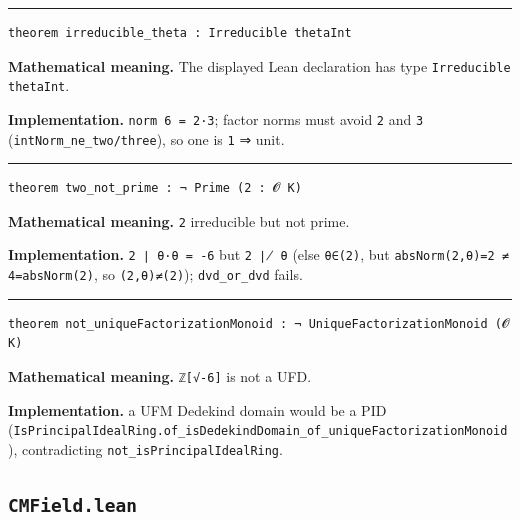 \documentclass[UTF8,a4paper,11pt,fontset=fandol]{ctexart}
\theoremstyle{definition}
\newcommand{\statementsep}{\par\medskip\hrule\medskip}
\begin{document}
\statementsep
\begin{verbatim}
theorem irreducible_theta : Irreducible thetaInt
\end{verbatim}
\noindent\textbf{Mathematical meaning.} The displayed Lean declaration has type \texttt{Irreducible thetaInt}.\par
\noindent\textbf{Implementation.} \texttt{norm 6 = 2·3}; factor norms must avoid \texttt{2} and \texttt{3} (\texttt{intNorm\_\allowbreak{}ne\_\allowbreak{}two/\allowbreak{}three}), so one is \texttt{1} ⇒ unit.\par
\statementsep
\begin{verbatim}
theorem two_not_prime : ¬ Prime (2 : 𝓞 K)
\end{verbatim}
\noindent\textbf{Mathematical meaning.} \texttt{2} irreducible but not prime.\par
\noindent\textbf{Implementation.} \texttt{2 ∣ θ·θ = -6} but \texttt{2 ∤ θ} (else \texttt{θ∈(2)}, but \texttt{absNorm(2,θ)=2 ≠ 4=absNorm(2)}, so \texttt{(2,θ)≠(2)}); \texttt{dvd\_\allowbreak{}or\_\allowbreak{}dvd} fails.\par
\statementsep
\begin{verbatim}
theorem not_uniqueFactorizationMonoid : ¬ UniqueFactorizationMonoid (𝓞 K)
\end{verbatim}
\noindent\textbf{Mathematical meaning.} \texttt{ℤ[√-6]} is not a UFD.\par
\noindent\textbf{Implementation.} a UFM Dedekind domain would be a PID (\texttt{IsPrincipalIdealRing.\allowbreak{}of\_\allowbreak{}isDedekindDomain\_\allowbreak{}of\_\allowbreak{}uniqueFactorizationMonoid}), contradicting \texttt{not\_\allowbreak{}isPrincipalIdealRing}.\par

\subsection{\texttt{CMField.lean}}
\end{document}
